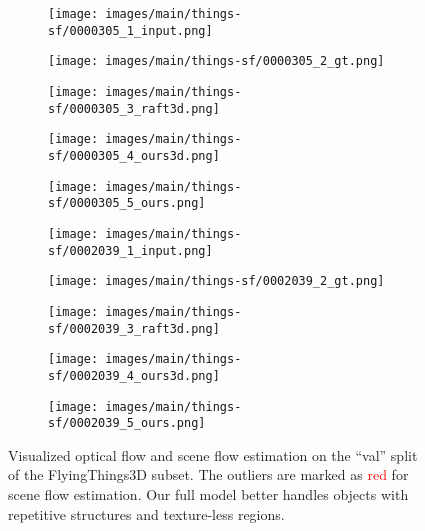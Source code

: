 \documentclass[10pt,twocolumn,letterpaper]{article}
\begin{document}
\begin{figure*}
    \vspace{-3pt}
    \begin{subfigure}[b]{0.198\linewidth}
        \texttt{[image: images/main/things-sf/0000305\_1\_input.png]}
    \end{subfigure}\hfill
    \begin{subfigure}[b]{0.198\linewidth}
        \texttt{[image: images/main/things-sf/0000305\_2\_gt.png]}
    \end{subfigure}\hfill
    \begin{subfigure}[b]{0.198\linewidth}
        \texttt{[image: images/main/things-sf/0000305\_3\_raft3d.png]}
    \end{subfigure}\hfill
    \begin{subfigure}[b]{0.198\linewidth}
        \texttt{[image: images/main/things-sf/0000305\_4\_ours3d.png]}
    \end{subfigure}\hfill
    \begin{subfigure}[b]{0.198\linewidth}
        \texttt{[image: images/main/things-sf/0000305\_5\_ours.png]}
    \end{subfigure}\hfill
    
    \begin{subfigure}[b]{0.198\linewidth}
        \texttt{[image: images/main/things-sf/0002039\_1\_input.png]}
    \end{subfigure}\hfill
    \begin{subfigure}[b]{0.198\linewidth}
        \texttt{[image: images/main/things-sf/0002039\_2\_gt.png]}
    \end{subfigure}\hfill
    \begin{subfigure}[b]{0.198\linewidth}
        \texttt{[image: images/main/things-sf/0002039\_3\_raft3d.png]}
    \end{subfigure}\hfill
    \begin{subfigure}[b]{0.198\linewidth}
        \texttt{[image: images/main/things-sf/0002039\_4\_ours3d.png]}
    \end{subfigure}\hfill
    \begin{subfigure}[b]{0.198\linewidth}
        \texttt{[image: images/main/things-sf/0002039\_5\_ours.png]}
    \end{subfigure}\hfill

    \vspace{-5pt}
    \caption{Visualized optical flow and scene flow estimation on the ``val'' split of the FlyingThings3D subset. The outliers are marked as \textcolor{red}{red} for scene flow estimation. Our full model better handles objects with repetitive structures and texture-less regions.}
    \vspace{-5pt}
    
    \label{fig:main-things}
\end{figure*}
\end{document}
